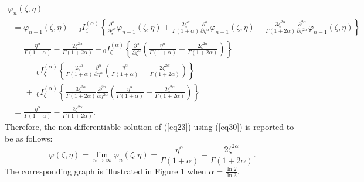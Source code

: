 \documentclass[10pt]{NSP1}
\begin{document}
\begin{equation}
\label{eq36}
\begin{array}{llllll}
 \varphi _n \left( {\zeta ,\eta } \right) \\
\;\; =\varphi _{n-1} \left( {\zeta ,\eta } \right)-{ }_0I_\zeta ^{\left( \alpha
\right)}\left\{ {\frac{\partial ^\alpha }{\partial \zeta ^\alpha }\varphi
_{n-1} \left( {\zeta ,\eta } \right)+\frac{2\zeta ^\alpha }{\Gamma \left(
{1+\alpha } \right)}\frac{\partial ^\alpha }{\partial \eta ^\alpha }\varphi
_{n-1} \left( {\zeta ,\eta } \right)-\frac{3\zeta ^{2\alpha }}{\Gamma \left(
{1+2\alpha } \right)}\frac{\partial ^{2\alpha }}{\partial \eta ^{2\alpha
}}\varphi _{n-1} \left( {\zeta ,\eta } \right)} \right\} \\
\;\; =\frac{\eta ^\alpha }{\Gamma \left( {1+\alpha } \right)}-\frac{2\zeta
^{2\alpha }}{\Gamma \left( {1+2\alpha } \right)}-{ }_0I_\zeta ^{\left(
\alpha \right)}\left\{ {\frac{\partial ^\alpha }{\partial \zeta ^\alpha
}\left( {\frac{\eta ^\alpha }{\Gamma \left( {1+\alpha }
\right)}-\frac{2\zeta ^{2\alpha }}{\Gamma \left( {1+2\alpha } \right)}}
\right)} \right\} \\
\qquad - \;_0I_\zeta ^{\left( \alpha \right)}\left\{ {\frac{2\zeta ^\alpha }{\Gamma
\left( {1+\alpha } \right)}\frac{\partial ^\alpha }{\partial \eta ^\alpha
}\left( {\frac{\eta ^\alpha }{\Gamma \left( {1+\alpha }
\right)}-\frac{2\zeta ^{2\alpha }}{\Gamma \left( {1+2\alpha } \right)}}
\right)} \right\} \\
\qquad +\;_0I_\zeta ^{\left( \alpha \right)}\left\{ {\frac{3\zeta ^{2\alpha
}}{\Gamma \left( {1+2\alpha } \right)}\frac{\partial ^{2\alpha }}{\partial
\eta ^{2\alpha }}\left( {\frac{\eta ^\alpha }{\Gamma \left( {1+\alpha }
\right)}-\frac{2\zeta ^{2\alpha }}{\Gamma \left( {1+2\alpha } \right)}}
\right)} \right\} \\
\;\; =\frac{\eta ^\alpha }{\Gamma \left( {1+\alpha } \right)}-\frac{2\zeta
^{2\alpha }}{\Gamma \left( {1+2\alpha } \right)}.
\end{array}
\end{equation}
Therefore, the non-differentiable solution of (\ref{eq23})
using (\ref{eq30}) is reported to be as follows:
\begin{equation}
\label{eq37}
\varphi \left( {\zeta ,\eta } \right)=\mathop {\lim }\limits_{n\to \infty }
\varphi _n \left( {\zeta ,\eta } \right)=\frac{\eta ^\alpha }{\Gamma \left(
{1+\alpha } \right)}-\frac{2\zeta ^{2\alpha }}{\Gamma \left( {1+2\alpha }
\right)}.
\end{equation}
The corresponding graph is illustrated in Figure 1 when $\alpha =\frac{\ln 2}{\ln
3}$.
\end{document}
